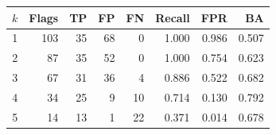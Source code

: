\begin{tabular}{@{}rrrrrrrr@{}}\toprule
$k$ & Flags & TP & FP & FN & Recall & FPR & BA \\
\midrule
1 & 103 & 35 & 68 & 0 & 1.000 & 0.986 & 0.507 \\
2 & 87 & 35 & 52 & 0 & 1.000 & 0.754 & 0.623 \\
3 & 67 & 31 & 36 & 4 & 0.886 & 0.522 & 0.682 \\
4 & 34 & 25 & 9 & 10 & 0.714 & 0.130 & 0.792 \\
5 & 14 & 13 & 1 & 22 & 0.371 & 0.014 & 0.678 \\
\bottomrule\end{tabular}
